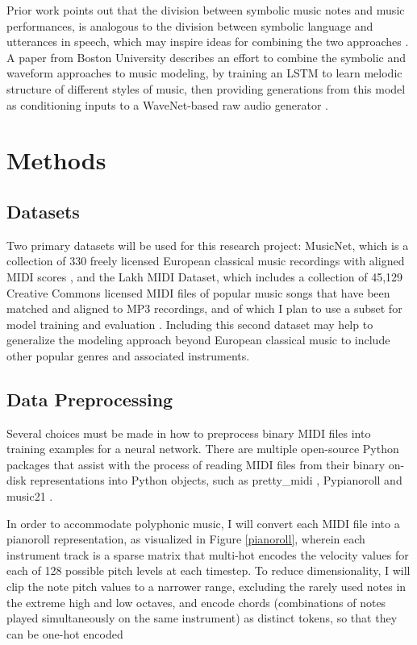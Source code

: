 \documentclass[sigconf,authorversion]{acmart}
\begin{document}
Prior work points out that the division between symbolic music notes
and music performances, is analogous to the division between symbolic
language and utterances in speech, which may inspire ideas for
combining the two approaches \cite{hawthorne2019enabling}. A paper
from Boston University describes an effort to combine the symbolic and
waveform approaches to music modeling, by training an LSTM to learn
melodic structure of different styles of music, then providing
generations from this model as conditioning inputs to a WaveNet-based
raw audio generator \cite{manzelli_conditioning_2018}.

\section{Methods}

\subsection{Datasets}

Two primary datasets will be used for this research project: MusicNet,
which is a collection of 330 freely licensed European classical music
recordings with aligned MIDI scores \cite{thickstun2017learning}, and
the Lakh MIDI Dataset, which includes a collection of 45,129 Creative
Commons licensed MIDI files of popular music songs that have been
matched and aligned to MP3 recordings, and of which I plan to use a
subset for model training and evaluation
\cite{raffel_learning-based_2016}. Including this second dataset may
help to generalize the modeling approach beyond European classical
music to include other popular genres and associated instruments.


\subsection{Data Preprocessing}

Several choices must be made in how to preprocess binary MIDI files
into training examples for a neural network. There are multiple
open-source Python packages that assist with the process of reading
MIDI files from their binary on-disk representations into Python
objects, such as pretty\_midi \cite{raffel_pretty_midi_2014},
Pypianoroll \cite{dong_pypianoroll_2018} and music21
\cite{cuthbert_music21_2010}.

In order to accommodate polyphonic music, I will convert each MIDI
file into a pianoroll representation, as visualized in Figure
\ref{pianoroll}, wherein each instrument track is a sparse matrix that
multi-hot encodes the velocity values for each of 128 possible pitch
levels at each timestep. To reduce dimensionality, I will clip the
note pitch values to a narrower range, excluding the rarely used notes
in the extreme high and low octaves, and encode chords (combinations
of notes played simultaneously on the same instrument) as distinct
tokens, so that they can be one-hot encoded
\end{document}
